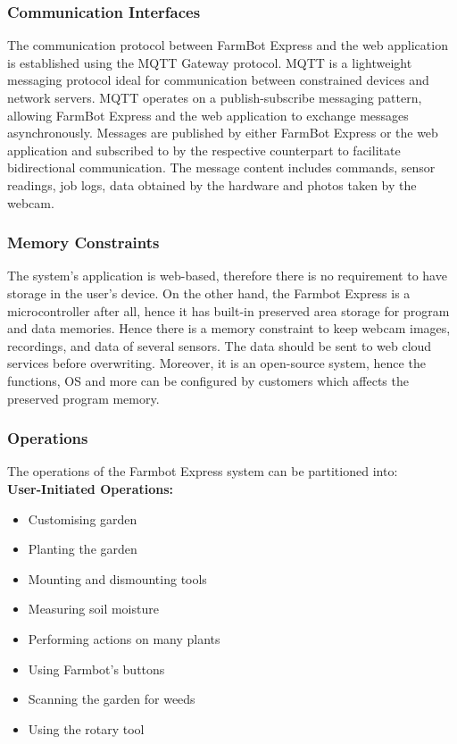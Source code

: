 \subsubsection{Communication Interfaces}

The communication protocol between FarmBot Express and the web application is established using the MQTT Gateway protocol. MQTT is a lightweight messaging protocol ideal for communication between constrained devices and network servers. MQTT operates on a publish-subscribe messaging pattern, allowing FarmBot Express and the web application to exchange messages asynchronously. Messages are published by either FarmBot Express or the web application and subscribed to by the respective counterpart to facilitate bidirectional communication. The message content includes commands, sensor readings, job logs, data obtained by the hardware and photos taken by the webcam.

\subsubsection{Memory Constraints}

The system's application is web-based, therefore there is no requirement to have storage in the user's device. On the other hand, the Farmbot Express is a microcontroller after all, hence it has built-in preserved area storage for program and data memories. Hence there is a memory constraint to keep webcam images, recordings, and data of several sensors. The data should be sent to web cloud services before overwriting. Moreover, it is an open-source system, hence the functions, OS and more can be configured by customers which affects the preserved program memory. 

\subsubsection{Operations}

The operations of the Farmbot Express system can be partitioned into: \\
\textbf{User-Initiated Operations:}
\begin{itemize}
    \item Customising garden
    \item Planting the garden
    \item Mounting and dismounting tools
    \item Measuring soil moisture
    \item Performing actions on many plants
    \item Using Farmbot's buttons
    \item Scanning the garden for weeds
    \item Using the rotary tool
\end{itemize}


